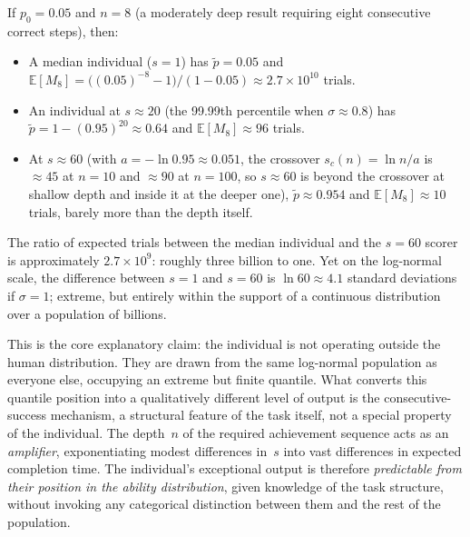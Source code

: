 \documentclass{article}
\begin{document}
If $p_0 = 0.05$ and $n = 8$ (a moderately deep result requiring eight
consecutive correct steps), then:
\begin{itemize}
  \item A median individual ($s = 1$) has $\widetilde{p} = 0.05$ and
        $\mathbb{E}[M_8] = \bigl((0.05)^{-8}-1\bigr)/(1-0.05) \approx 2.7 \times
        10^{10}$ trials.
  \item An individual at $s \approx 20$ (the 99.99th percentile when
        $\sigma \approx 0.8$) has
        $\widetilde{p} = 1 - (0.95)^{20} \approx 0.64$ and
        $\mathbb{E}[M_8] \approx 96$ trials.
  \item At $s \approx 60$ (with $a = -\ln 0.95 \approx 0.051$, the crossover $s_c(n) = \ln n / a$ is $\approx 45$ at $n = 10$ and $\approx 90$ at $n = 100$, so $s \approx 60$ is beyond the crossover at shallow depth and inside it at the deeper one),
        $\widetilde{p} \approx 0.954$ and $\mathbb{E}[M_8] \approx 10$
        trials, barely more than the depth itself.
\end{itemize}
The ratio of expected trials between the median individual and the
$s = 60$ scorer is approximately $2.7 \times 10^{9}$: roughly three
billion to one. Yet on the log-normal scale, the difference between $s = 1$ and
$s = 60$ is $\ln 60 \approx 4.1$ standard deviations if $\sigma = 1$;
extreme, but entirely within the support of a continuous distribution
over a population of billions.

This is the core explanatory claim: the individual is not operating
outside the human distribution. They are drawn from the same log-normal
population as everyone else, occupying an extreme but finite quantile.
What converts this quantile position into a qualitatively different level
of output is the consecutive-success mechanism, a structural feature of
the task itself, not a special property of the individual. The depth~$n$
of the required achievement sequence acts as an \emph{amplifier},
exponentiating modest differences in~$s$ into vast differences in expected
completion time. The individual's exceptional output is therefore
\emph{predictable from their position in the ability distribution}, given
knowledge of the task structure, without invoking any categorical
distinction between them and the rest of the population.
\end{document}
